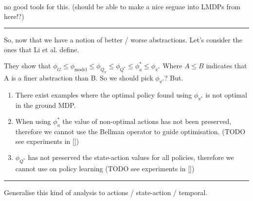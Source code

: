 {\color{red}no good tools for this. (should be able to make a nice seguae into LMDPs from here!?)}

\begin{center}\rule{0.5\linewidth}{\linethickness}\end{center}


So, now that we have a notion of better / worse abstractions. Let's consider the ones
that Li et al. \cite{Littman2006} define.

They show that $\phi_G \le \phi_{\text{model}} \le \phi_{Q_{\pi}} \le \phi_{Q^{* }} \le \phi_a^{* } \le \phi_{\pi^{* }}$
Where $A \le B$ indicates that A is a finer abstraction than B.
So we should pick $\phi_{\pi^{* }}$? But.

\begin{enumerate}
  \tightlist
  \item There exist examples where the optimal policy found using $\phi_{\pi^{* }}$ is not optimal in the ground MDP. \cite{Jong2005}
  \item When using $\phi_a^{* }$ the value of non-optimal actions has not been preserved,
  therefore we cannot use the Bellman operator to guide optimisation. ({\color{red}TODO} see experiments in \ref{})
  \item $\phi_{Q^{* }}$ has not preserved the state-action values for all policies,
  therefore we cannot use on policy learning ({\color{red}TODO} see experiments in \ref{})
\end{enumerate}


\begin{center}\rule{0.5\linewidth}{\linethickness}\end{center}

Generalise this kind of analysis to actions / state-action / temporal.




